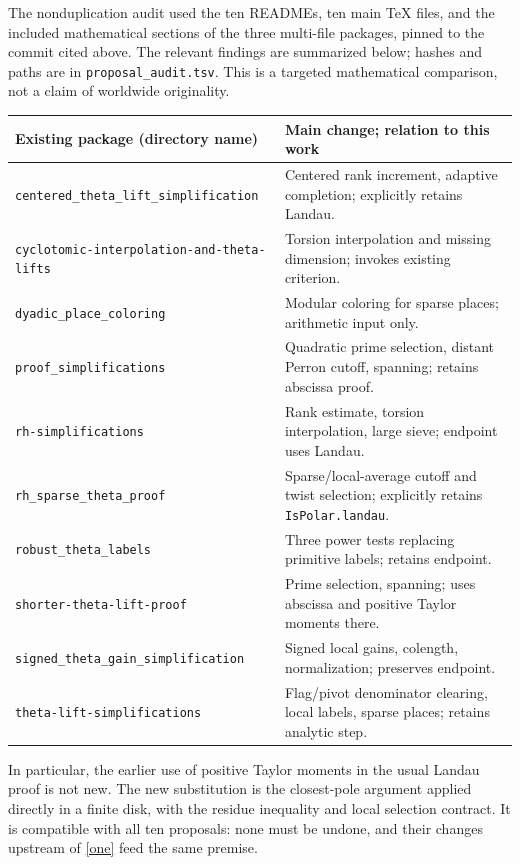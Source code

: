 \documentclass[11pt]{article}
\theoremstyle{remark}\newtheorem{remark}[theorem]{Remark}
\begin{document}
The nonduplication audit used the ten READMEs, ten main TeX files, and the included mathematical sections of the three multi-file packages, pinned to the commit cited above. The relevant findings are summarized below; hashes and paths are in \texttt{proposal\_audit.tsv}. This is a targeted mathematical comparison, not a claim of worldwide originality.
\begin{center}\small
\begin{tabularx}{\linewidth}{@{}p{.45\linewidth}X@{}}\toprule
Existing package (directory name) & Main change; relation to this work\\\midrule
\texttt{centered\_theta\_lift\_simplification} & Centered rank increment, adaptive completion; explicitly retains Landau.\\
\texttt{cyclotomic-interpolation-and-theta-lifts} & Torsion interpolation and missing dimension; invokes existing criterion.\\
\texttt{dyadic\_place\_coloring} & Modular coloring for sparse places; arithmetic input only.\\
\texttt{proof\_simplifications} & Quadratic prime selection, distant Perron cutoff, spanning; retains abscissa proof.\\
\texttt{rh-simplifications} & Rank estimate, torsion interpolation, large sieve; endpoint uses Landau.\\
\texttt{rh\_sparse\_theta\_proof} & Sparse/local-average cutoff and twist selection; explicitly retains \texttt{IsPolar.landau}.\\
\texttt{robust\_theta\_labels} & Three power tests replacing primitive labels; retains endpoint.\\
\texttt{shorter-theta-lift-proof} & Prime selection, spanning; uses abscissa and positive Taylor moments there.\\
\texttt{signed\_theta\_gain\_simplification} & Signed local gains, colength, normalization; preserves endpoint.\\
\texttt{theta-lift-simplifications} & Flag/pivot denominator clearing, local labels, sparse places; retains analytic step.\\\bottomrule
\end{tabularx}
\end{center}
In particular, the earlier use of positive Taylor moments in the usual Landau proof is not new. The new substitution is the closest-pole argument applied directly in a finite disk, with the residue inequality and local selection contract. It is compatible with all ten proposals: none must be undone, and their changes upstream of \eqref{one} feed the same premise.
\end{document}
